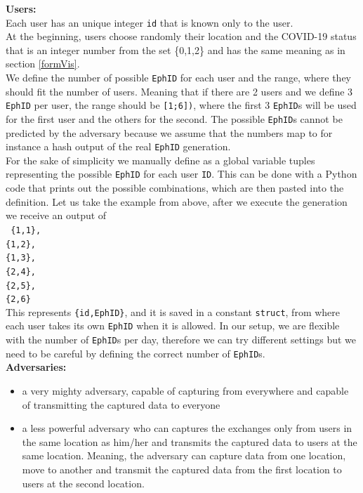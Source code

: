 \documentclass[a4paper, twocolumn]{article}
\begin{document}
\noindent \textbf{Users:}\\
Each user has an unique integer \texttt{id} that is known only to the user.\\
At the beginning, users choose randomly their location and the COVID-19 status that is an integer number from the set \{0,1,2\} and has the same meaning as in section \ref{formVis}.\\
We define the number of possible \texttt{EphID} for each user and the range, where they should fit the number of users. Meaning that if there are 2 users and we define 3 \texttt{EphID} per user, the range should be \texttt{[1;6])}, where the first 3 \texttt{EphID}s will be used for the first user and the others for the second. The possible \texttt{EphID}s cannot be predicted by the adversary because we assume that the numbers map to for instance a hash output of the real \texttt{EphID} generation.\\
For the sake of simplicity we manually define as a global variable tuples representing the possible \texttt{EphID} for each user \texttt{ID}. This can be done with a Python code that prints out the possible combinations, which are then pasted into the definition. Let us take the example from above, after we execute the generation we receive an output of \\
\texttt{
    \colorbox{backcolour}{\{1,1\},}\\
    \colorbox{backcolour}{\{1,2\},}\\
    \colorbox{backcolour}{\{1,3\},}\\
    \colorbox{backcolour}{\{2,4\},}\\
    \colorbox{backcolour}{\{2,5\},}\\
    \colorbox{backcolour}{\{2,6\}}
}\\
This represents \texttt{\{id,EphID\}}, and it is saved in a constant \texttt{struct}, from where each user takes its own \texttt{EphID} when it is allowed. In our setup, we are flexible with the number of \texttt{EphID}s per day, therefore we can try different settings but we need to be careful by defining the correct number of \texttt{EphID}s.\\

\noindent \textbf{Adversaries:}
\begin{itemize}
    \item a very mighty adversary, capable of capturing from everywhere and capable of transmitting the captured data to everyone
    \item a less powerful adversary who can captures the exchanges only from users in the same location as him/her and transmits the captured data to users at the same location. Meaning, the adversary can capture data from one location, move to another and transmit the captured data from the first location to users at the second location.
\end{itemize}
\end{document}
